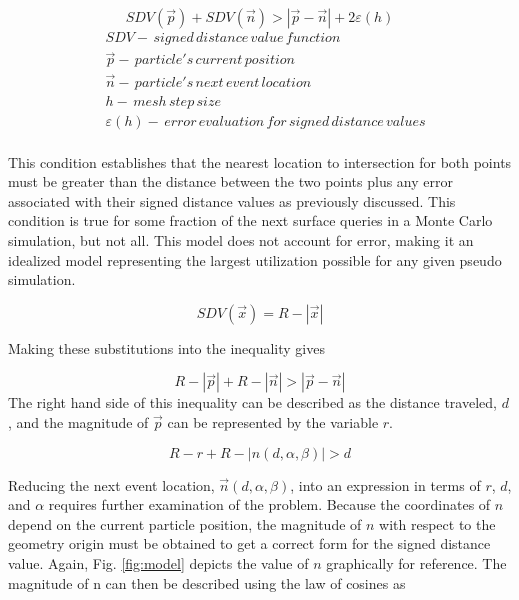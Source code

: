 \begin{equation}
  SDV(\vec{p}) + SDV(\vec{n}) > |\vec{p}-\vec{n}| + 2\varepsilon(h)
  \label{eq:condition}
\end{equation}
\begin{align*}
 &SDV - \, signed \, distance \, value \, function \\
 &\vec{p} - \, particle's \, current \, position \\
 &\vec{n} - \, particle's \, next \, event \, location \\
 &h - \, mesh \, step \, size \\
 &\varepsilon(h) - \, error \, evaluation \, for \, signed \, distance \, values \\
\end{align*}

This condition establishes that the nearest location to intersection for both
points must be greater than the distance between the two points plus any error
associated with their signed distance values as previously discussed. This
condition is true for some fraction of the next surface queries in a Monte Carlo
simulation, but not all.  This model does not account for error, making it an
idealized model representing the largest utilization possible for any given
pseudo simulation.

\begin{equation}
SDV(\vec{x}) =  R-|\vec{x}|
\end{equation}

Making these substitutions into the inequality gives

\begin{equation}
R-|\vec{p}| + R - |\vec{n}| >   |\vec{p}-\vec{n}|
\end{equation}
The right hand side of this inequality can be described as the distance
traveled, $d$, and the magnitude of $\vec{p}$ can be represented
by the variable $r$.

\begin{equation}
 R-r + R - |n(d,\alpha,\beta)| > d
\end{equation}

Reducing the next event location, $\vec{n}(d,\alpha,\beta)$, into an expression
in terms of $r$, $d$, and $\alpha$ requires further examination of the
problem. Because the coordinates of $n$ depend on the current particle position,
the magnitude of $n$ with respect to the geometry origin must be obtained to get
a correct form for the signed distance value. Again, Fig. \ref{fig:model} depicts the
value of $n$ graphically for reference. The magnitude of n can then be described
using the law of cosines as

